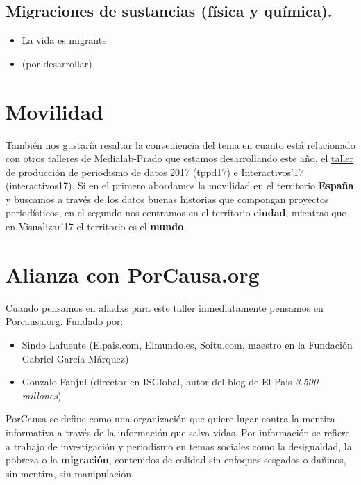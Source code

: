 \documentclass[11pt]{article}
\begin{document}
\subsection*{Migraciones de sustancias (física y química).}
\label{sec-3-4}
\begin{itemize}
\item La vida es migrante
\item (por desarrollar)
\end{itemize}

\section*{Movilidad}
\label{sec-4}

También nos gustaría resaltar la conveniencia del tema en cuanto está relacionado con otros talleres de Medialab-Prado que estamos desarrollando este año, el \href{http://medialab-prado.es/article/v-taller-de-produccion-de-periodismo-de-datos-la-espana-vacia}{taller de producción de periodismo de datos 2017} (tppd17) e \href{http://medialab-prado.es/article/interactivos17}{Interactivos'17} (interactivos17). Si en el primero abordamos la movilidad en el territorio \textbf{España} y buscamos a través de los datos buenas historias que compongan proyectos periodísticos, en el segundo nos centramos en el territorio \textbf{ciudad}, mientras que en Visualizar'17 el territorio es el \textbf{mundo}.

\section*{Alianza con PorCausa.org}
\label{sec-5}

Cuando pensamos en aliadxs para este taller inmediatamente pensamos en \href{http://porcausa.org}{Porcausa.org}. Fundado por:

\begin{itemize}
\item Sindo Lafuente (Elpais.com, Elmundo.es, Soitu.com, maestro en la Fundación Gabriel García Márquez)
\item Gonzalo Fanjul (director en ISGlobal, autor del blog de El Pais \emph{3.500 millones})
\end{itemize}

PorCausa se define como una organización que quiere lugar contra la mentira informativa a través de la información que salva vidas. Por información se refiere a trabajo de investigación y periodismo en temas sociales como la desigualdad, la pobreza o la \textbf{migración}, contenidos de calidad sin enfoques sesgados o dañinos, sin mentira, sin manipulación.
\end{document}

